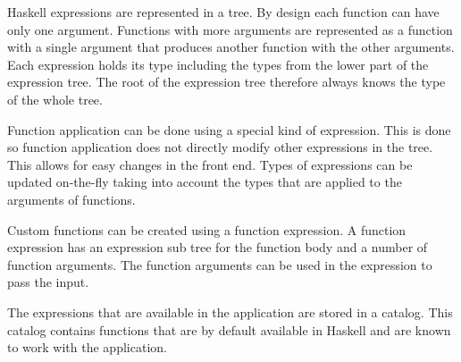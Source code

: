 Haskell expressions are represented in a tree. By design each function can have only one argument. Functions with more
arguments are represented as a function with a single argument that produces another function with the other arguments.
Each expression holds its type including the types from the lower part of the expression tree. The root of the
expression tree therefore always knows the type of the whole tree.

Function application can be done using a special kind of expression. This is done so function application does not
directly modify other expressions in the tree. This allows for easy changes in the front end. Types of expressions can
be updated on-the-fly taking into account the types that are applied to the arguments of functions.

Custom functions can be created using a function expression.
A function expression has an expression sub tree for the function body and a number of function arguments.
The function arguments can be used in the expression to pass the input.

The expressions that are available in the application are stored in a catalog. This catalog contains functions that are
by default available in Haskell and are known to work with the application.
